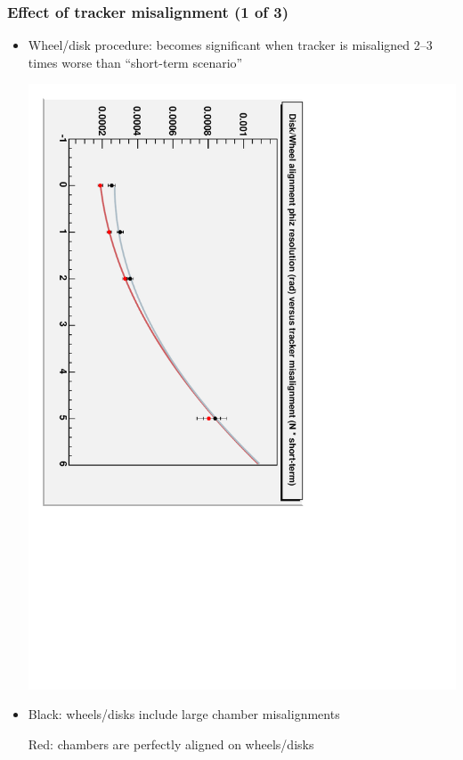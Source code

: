 \documentclass[compress]{beamer}
\begin{document}
\begin{frame}
\frametitle{Effect of tracker misalignment (1 of 3)}
\begin{itemize}
\item Wheel/disk procedure: becomes significant when tracker is
misaligned 2--3 times worse than ``short-term scenario''

\begin{center}
\includegraphics[height=0.8\linewidth, angle=90]{vstracker_disk.pdf}
\end{center}

\item Black: wheels/disks include large chamber misalignments

Red: chambers are perfectly aligned on wheels/disks
\end{itemize}
\end{frame}
\end{document}
